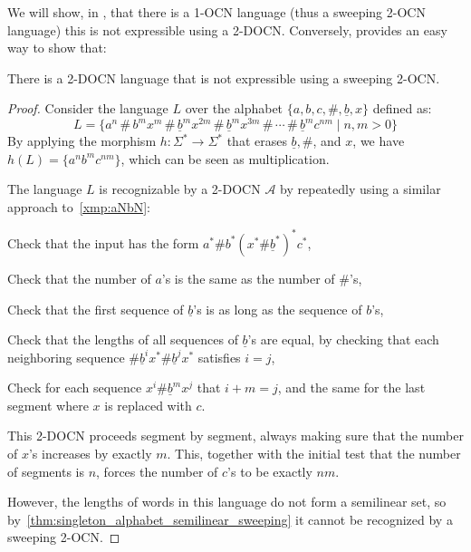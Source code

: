 \documentclass[USenglish]{lipics-v2021}
\newcommand{\cA}{\mathcal{A}}
\begin{document}
We will show, in , that there is a 1-OCN language (thus
a sweeping 2-OCN language) this is not expressible using a 2-DOCN.  Conversely,
 provides an easy way to show that:
\begin{corollary}
	There is a 2-DOCN language that is not expressible using a sweeping 2-OCN.
\end{corollary}
\begin{proof}
	\def\ub{\underline{b}}%
	\def\ss{\,\#\,}%
	Consider the language \(L\) over the alphabet \(\{a, b, c, \#, \ub, x\}\) defined
	as:
	\[L = \{a^n\ss b^mx^m\ss\ub^mx^{2m}\ss\ub^mx^{3m}\ss\cdots\ss\ub^mc^{nm} \mid n, m > 0\}\]
	By applying the morphism $h\colon \Sigma^*\to \Sigma^*$ that erases $\ub,\#$, and $x$, we
	have $h(L) = \{a^nb^mc^{nm}\}$, which can be seen as multiplication.
	
	The language $L$ is recognizable by a 2-DOCN $\cA$ by repeatedly using a
	similar approach to~\cref{xmp:aNbN}:
	\begin{compactitem}
		\item Check that the input has the form \(a^*\#b^*(x^*\#\ub^*)^*c^*\),
		\item Check that the number of \(a\)'s is the same as the number of \(\#\)'s,
		\item Check that the first sequence of \(\ub\)'s is as long as the sequence of \(b\)'s,
		\item Check that the lengths of all sequences of \(\ub\)'s are equal, by checking that each neighboring sequence
		\(\#\ub^ix^*\#\ub^jx^*\) satisfies \(i = j\),
		\item Check for each sequence \(x^i\#\ub^mx^j\) that \(i + m = j\), and the same
		for the last segment where $x$ is replaced with $c$.
	\end{compactitem}
	This 2-DOCN proceeds segment by segment, always making sure that the number of
	$x$'s increases by exactly $m$. This, together with the initial test that the
	number of segments is $n$, forces the number of $c$'s to be exactly $nm$.
	
	However, the lengths of words in this language do not form a semilinear set,
	so by~\cref{thm:singleton_alphabet_semilinear_sweeping} it cannot be
	recognized by a sweeping 2-OCN.
\end{proof}
\end{document}
